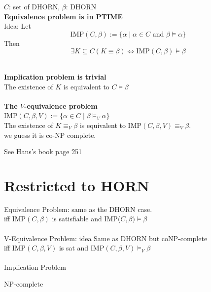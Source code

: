 \documentclass[12pt]{article}
\begin{document}
$C$: set of DHORN, $\beta$: DHORN \\

{\bf Equivalence problem is in PTIME}\\

Idea: Let $$\mbox{IMP}(C,\beta):=\{\alpha\mid \alpha\in C \mbox{ and }\beta\models \alpha\}$$
Then
$$\exists K\subseteq  C(K\equiv \beta)\Longleftrightarrow\mbox{IMP}(C,\beta)\models \beta$$


\ \\

{\bf Implication problem is trivial} \\ 

The existence of $K$ is equivalent to $C\models\beta$\\

\ \\


{\bf The $V$-equivalence problem}\\

IMP$(C,\beta,V):=\{\alpha\in C\mid \beta\models_V \alpha\}$\\

The existence of $K\equiv_V \beta$ is equivalent to IMP$(C,\beta, V)\equiv_V\beta$.\\

we guess it is co-NP complete.

See Hans's book page 251


\section{Restricted to HORN}


Equivalence Problem: same as the DHORN case.\\

iff IMP$(C,\beta)$ is satisfiable and IMP($C,\beta)\models \beta$\\ 

\ \\

V-Equivalence Problem: idea Same as DHORN but coNP-complete\\ 

iff IMP$(C, \beta, V)$ is sat and IMP$(C,\beta,V)\models_V \beta$ \\

\ \\

Implication Problem

NP-complete  
\end{document}
